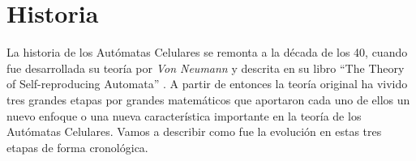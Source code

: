 \section{Historia}
La historia de los Autómatas Celulares se remonta a la década de los 40, cuando fue desarrollada su teoría por \textit{Von Neumann} y descrita en su libro ``The Theory of Self-reproducing Automata'' \cite{Teoria_Von_neumann}.
A partir de entonces la teoría original ha vivido tres grandes etapas por grandes matemáticos que aportaron cada uno de ellos un nuevo enfoque o una nueva característica importante en la teoría de los Autómatas Celulares.
Vamos a describir como fue la evolución en estas tres etapas de forma cronológica. 



